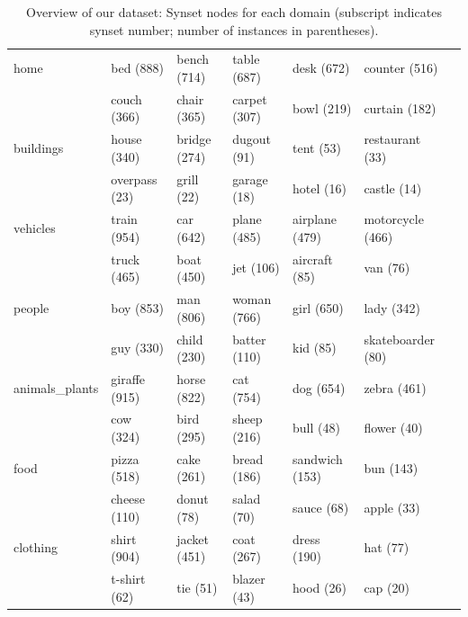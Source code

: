 \documentclass[11pt,a4paper]{article}
\begin{document}
\begin{table}[t]
	\small
	\centering
 \begin{tabular}{ll@{~}l@{~}l@{~}l@{~}l@{~}l@{~}}
 	\toprule
 	{} &              &                  \\
 	\midrule
 	home           &  bed (888) &  bench (714) &  table (687) &  desk (672) &  counter (516) \\
 	&  couch (366) &  chair (365) &  carpet (307) &  bowl (219) &  curtain (182) \\
 	buildings      &  house (340) &  bridge (274) &  dugout (91) &  tent (53) &  restaurant (33)\\
 	 &  overpass (23) 	&  grill (22) &  garage (18) &  hotel (16) &  castle (14) \\
 	vehicles       &  train (954) &  car (642) &  plane (485) &  airplane (479) &  motorcycle (466) \\
 	 &  truck (465) 	&  boat (450) &  jet (106) &  aircraft (85) &  van (76) \\
 	people         &  boy (853) &  man (806) &  woman (766) &  girl (650) &  lady (342)\\
 	 &  guy (330) &  child (230) &  batter (110) &  kid (85) &  skateboarder (80) \\
 	animals\_plants &  giraffe (915) &  horse (822) &  cat (754) &  dog (654) &  zebra (461) \\
 	&  cow (324) &  bird (295) &  sheep (216) &  bull (48) &  flower (40) \\
 	food           &  pizza (518) &  cake (261) &  bread (186) &  sandwich (153) &  bun (143)\\
 	 &  cheese (110)  	&  donut (78) &  salad (70) &  sauce (68) &  apple (33) \\
 	clothing       &  shirt (904) &  jacket (451) &  coat (267) &  dress (190) &  hat (77) \\
 	 	&  t-shirt (62) &  tie (51) &  blazer (43) &  hood (26) &  cap (20) \\
 	\bottomrule
 \end{tabular}
	\caption{Overview of our dataset: Synset nodes for each domain (subscript indicates synset number; number of instances in parentheses). %
	\label{tab:overview_dataset1transpose}}
\end{table}
\fi
\end{document}
